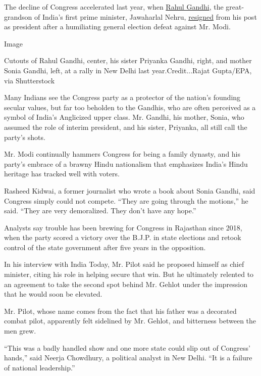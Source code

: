 The decline of Congress accelerated last year, when
\href{https://www.nytimes.com/2014/05/01/world/asia/political-stumbling-leaves-an-indian-heir-less-apparent.html}{Rahul
Gandhi}, the great-grandson of India's first prime minister, Jawaharlal
Nehru,
\href{https://www.nytimes.com/2019/07/03/world/asia/rahul-gandhi-resigns.html}{resigned}
from his post as president after a humiliating general election defeat
against Mr. Modi.

Image

Cutouts of Rahul Gandhi, center, his sister Priyanka Gandhi, right, and
mother Sonia Gandhi, left, at a rally in New Delhi last
year.Credit...Rajat Gupta/EPA, via Shutterstock

Many Indians see the Congress party as a protector of the nation's
founding secular values, but far too beholden to the Gandhis, who are
often perceived as a symbol of India's Anglicized upper class. Mr.
Gandhi, his mother, Sonia, who assumed the role of interim president,
and his sister, Priyanka, all still call the party's shots.

Mr. Modi continually hammers Congress for being a family dynasty, and
his party's embrace of a brawny Hindu nationalism that emphasizes
India's Hindu heritage has tracked well with voters.

Rasheed Kidwai, a former journalist who wrote a book about Sonia Gandhi,
said Congress simply could not compete. ``They are going through the
motions,'' he said. ``They are very demoralized. They don't have any
hope.''

Analysts say trouble has been brewing for Congress in Rajasthan since
2018, when the party scored a victory over the B.J.P. in state elections
and retook control of the state government after five years in the
opposition.

In his interview with India Today, Mr. Pilot said he proposed himself as
chief minister, citing his role in helping secure that win. But he
ultimately relented to an agreement to take the second spot behind Mr.
Gehlot under the impression that he would soon be elevated.

Mr. Pilot, whose name comes from the fact that his father was a
decorated combat pilot, apparently felt sidelined by Mr. Gehlot, and
bitterness between the men grew.

``This was a badly handled show and one more state could slip out of
Congress' hands,'' said Neerja Chowdhury, a political analyst in New
Delhi. ``It is a failure of national leadership.''

